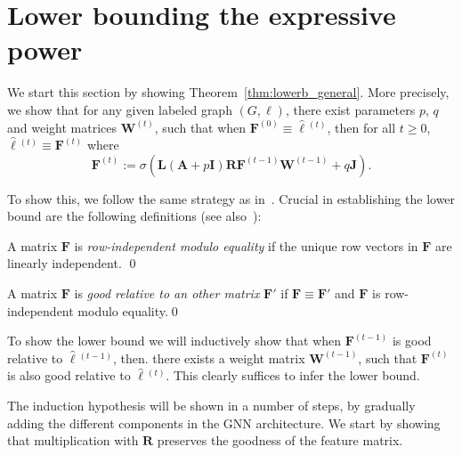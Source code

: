 
\section{Lower bounding the expressive power}\label{sec:lowerb}


We start this section by showing Theorem~\ref{thm:lowerb_general}.
More precisely, we show that for any given labeled graph
$(G,\pmb{\ell})$, there exist parameters $p$, $q$ and weight matrices $\mathbf{W}^{(t)}$, such that when $\mathbf{F}^{(0)}\equiv \hat{\pmb{\ell}}{}^{(t)}$, then for all $t\geq 0$, $\hat{\pmb{\ell}}{}^{(t)}\equiv \mathbf{F}^{(t)}$ where
$$
\mathbf{F}^{(t)}:=\sigma\left(\mathbf{L}(\mathbf{A}+p\mathbf{I})\mathbf{R}\mathbf{F}^{(t-1)}\mathbf{W}^{(t-1)} + q\mathbf{J}\right).$$ 

To show this, we follow the same strategy as in~\cite{grohewl}.
Crucial in establishing the lower bound are the following definitions (see also~\cite{grohewl}):
\begin{definition}\label{def:label2}\normalfont
A matrix $\mathbf{F}$ is \textit{row-independent modulo equality} if the unique row vectors in $\mathbf{F}$ are linearly independent. \qed
\end{definition}

\begin{definition}\label{def:label3}\normalfont
A matrix $\mathbf{F}$ is \textit{good relative to an other matrix} $\mathbf{F}'$ if $\mathbf{F}\equiv \mathbf{F}'$ and $\mathbf{F}$ is row-independent modulo equality.\qed
\end{definition}

To show the lower bound we will inductively show that when $\mathbf{F}^{(t-1)}$ is good relative to $\hat{\pmb{\ell}}{}^{(t-1)}$, then. there exists a weight matrix $\mathbf{W}^{(t-1)}$, such that 
$\mathbf{F}^{(t)}$ is also good relative to $\hat{\pmb{\ell}}{}^{(t)}$. This clearly suffices to infer the lower bound. 

The induction hypothesis will be shown in a number of steps, by gradually adding the different components in the GNN architecture. We start by showing that multiplication with $\mathbf{R}$ preserves the goodness of the feature matrix.

%


